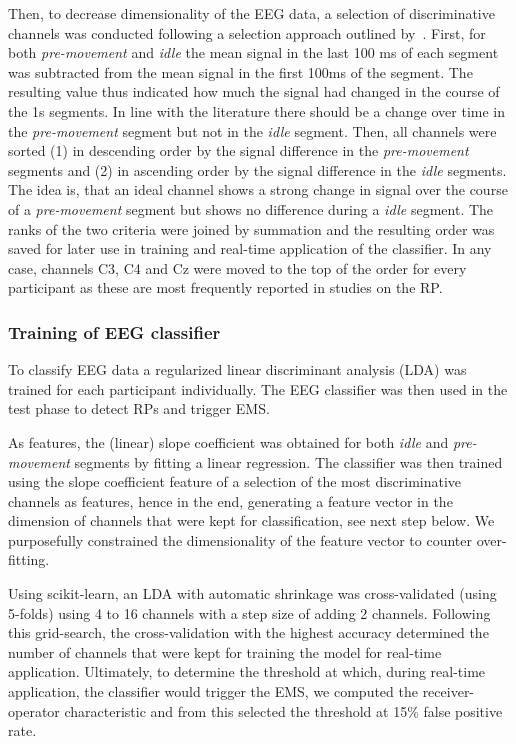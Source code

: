 Then, to decrease dimensionality of the EEG data, a selection of discriminative channels was conducted following a selection approach outlined by~\citep{Schultze-Kraft2021-cu}. First, for both \textit{pre-movement} and \textit{idle} the mean signal in the last 100 ms of each segment was subtracted from the mean signal in the first 100ms of the segment. The resulting value thus indicated how much the signal had changed in the course of the 1s segments. In line with the literature there should be a change over time in the \textit{pre-movement} segment but not in the \textit{idle} segment. Then, all channels were sorted (1) in descending order by the signal difference in the \textit{pre-movement} segments and (2) in ascending order by the signal difference in the \textit{idle} segments. The idea is, that an ideal channel shows a strong change in signal over the course of a \textit{pre-movement} segment but shows no difference during a \textit{idle} segment. The ranks of the two criteria were joined by summation and the resulting order was saved for later use in training and real-time application of the classifier. In any case, channels C3, C4 and Cz were moved to the top of the order for every participant as these are most frequently reported in studies on the RP.

\subsubsection{Training of EEG classifier}
To classify EEG data a regularized linear discriminant analysis (LDA) was trained for each participant individually. The EEG classifier was then used in the test phase to detect RPs and trigger EMS. 

As features, the (linear) slope coefficient was obtained for both \textit{idle} and \textit{pre-movement} segments by fitting a linear regression. The classifier was then trained using the slope coefficient feature of a selection of the most discriminative channels as features, hence in the end, generating a feature vector in the dimension of channels that were kept for classification, see next step below. We purposefully constrained the dimensionality of the feature vector to counter over-fitting. 

Using scikit-learn, an LDA with automatic shrinkage was cross-validated (using 5-folds) using 4 to 16 channels with a step size of adding 2 channels. Following this grid-search, the cross-validation with the highest accuracy determined the number of channels that were kept for training the model for real-time application. Ultimately, to determine the threshold at which, during real-time application, the classifier would trigger the EMS, we computed the receiver-operator characteristic and from this selected the threshold at 15\% false positive rate.

